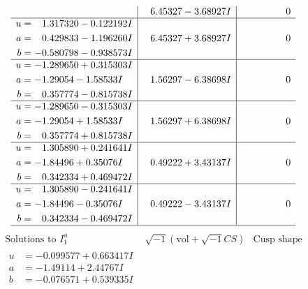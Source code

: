 \documentclass[1p]{elsarticle_modified}
\theoremstyle{definition}
\newcommand{\I}{\sqrt{-1}}
\begin{document}
$$\begin{array}{c|c|c}
 & \phantom{-}6.45327 - 3.68927 I & \phantom{-0.000000 } 0 \\ \hline\begin{aligned}
u &= \phantom{-}1.317320 - 0.122192 I \\
a &= \phantom{-}0.429833 - 1.196260 I \\
b &= -0.580798 - 0.938573 I\end{aligned}
 & \phantom{-}6.45327 + 3.68927 I & \phantom{-0.000000 } 0 \\ \hline\begin{aligned}
u &= -1.289650 + 0.315303 I \\
a &= -1.29054 - 1.58533 I \\
b &= \phantom{-}0.357774 - 0.815738 I\end{aligned}
 & \phantom{-}1.56297 - 6.38698 I & \phantom{-0.000000 } 0 \\ \hline\begin{aligned}
u &= -1.289650 - 0.315303 I \\
a &= -1.29054 + 1.58533 I \\
b &= \phantom{-}0.357774 + 0.815738 I\end{aligned}
 & \phantom{-}1.56297 + 6.38698 I & \phantom{-0.000000 } 0 \\ \hline\begin{aligned}
u &= \phantom{-}1.305890 + 0.241641 I \\
a &= -1.84496 + 0.35076 I \\
b &= \phantom{-}0.342334 + 0.469472 I\end{aligned}
 & \phantom{-}0.49222 + 3.43137 I & \phantom{-0.000000 } 0 \\ \hline\begin{aligned}
u &= \phantom{-}1.305890 - 0.241641 I \\
a &= -1.84496 - 0.35076 I \\
b &= \phantom{-}0.342334 - 0.469472 I\end{aligned}
 & \phantom{-}0.49222 - 3.43137 I & \phantom{-0.000000 } 0\\
 \hline 
 \end{array}$$\newpage$$\begin{array}{c|c|c}  
\text{Solutions to }I^u_{1}& \I (\text{vol} + \sqrt{-1}CS) & \text{Cusp shape}\\
 \hline 
\begin{aligned}
u &= -0.099577 + 0.663417 I \\
a &= -1.49114 + 2.44767 I \\
b &= -0.076571 + 0.539335 I\end{aligned}

\end{array}$$
\end{document}
